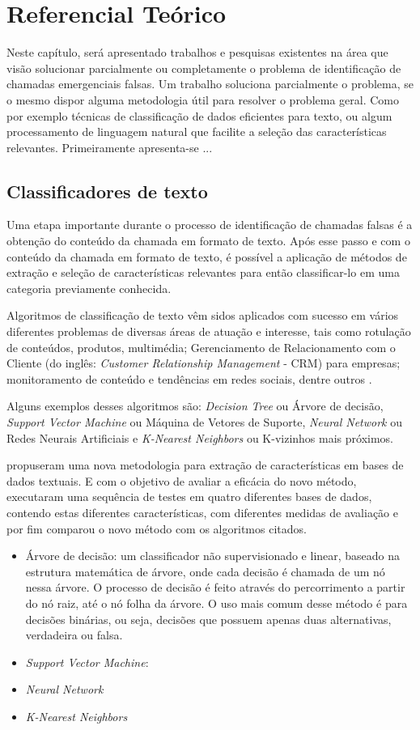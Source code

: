 \chapter{Referencial Teórico}
Neste capítulo, será apresentado trabalhos e pesquisas existentes na área que visão solucionar parcialmente ou completamente o problema de identificação de chamadas emergenciais falsas. Um trabalho soluciona parcialmente o problema, se o mesmo dispor alguma metodologia útil para resolver o problema geral. Como por exemplo técnicas de classificação de dados eficientes para texto, ou algum processamento de linguagem natural que facilite a seleção das características relevantes. Primeiramente apresenta-se ...

\section{Classificadores de texto}
Uma etapa importante durante o processo de identificação de chamadas falsas é a obtenção do conteúdo da chamada em formato de texto. Após esse passo e com o conteúdo da chamada em formato de texto, é possível a aplicação de métodos de extração e seleção de características relevantes para então classificar-lo em uma categoria previamente conhecida.

Algoritmos de classificação de texto vêm sidos aplicados com sucesso em vários diferentes  problemas de diversas áreas de atuação e interesse, tais como rotulação de conteúdos, produtos, multimédia; Gerenciamento de Relacionamento com o Cliente (do inglês: \textit{Customer Relationship Management} - CRM) para empresas; monitoramento de conteúdo e tendências em redes sociais, dentre outros \citep{uysal2012novel, gupta2018text}.

Alguns exemplos desses algoritmos são: \textit{Decision Tree} ou Árvore de decisão, \textit{Support Vector Machine} ou Máquina de Vetores de Suporte, \textit{Neural Network} ou Redes Neurais Artificiais e \textit{K-Nearest Neighbors} ou K-vizinhos mais próximos. 

\cite{uysal2012novel} propuseram uma nova metodologia para extração de características em bases de dados textuais. E com o objetivo de avaliar a eficácia do novo método, executaram uma sequência de testes em quatro diferentes bases de dados, contendo estas diferentes características, com diferentes medidas de avaliação e por fim comparou o novo método com os algoritmos citados.

\begin{itemize}
    \item Árvore de decisão: um classificador não supervisionado e linear, baseado na estrutura matemática de árvore, onde cada decisão é chamada de um nó nessa árvore. O processo de decisão é feito através do percorrimento a partir do nó raiz, até o nó folha da árvore. O uso mais comum desse método é para decisões binárias, ou seja, decisões que possuem apenas duas alternativas, verdadeira ou falsa.
    \item \textit{Support Vector Machine}:
    \item \textit{Neural Network}
    \item \textit{K-Nearest Neighbors}
\end{itemize}

